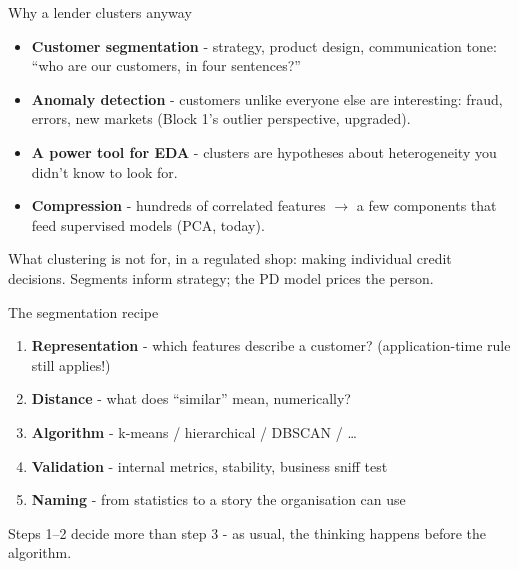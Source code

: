 \documentclass[10pt,aspectratio=169]{beamer}
\begin{document}
\begin{frame}{Why a lender clusters anyway}
  \begin{itemize}
    \item \textbf{Customer segmentation} - strategy, product design,
          communication tone: ``who are our customers, in four sentences?''
    \item \textbf{Anomaly detection} - customers unlike everyone else are
          interesting: fraud, errors, new markets (Block 1's outlier
          perspective, upgraded).
    \item \textbf{A power tool for EDA} - clusters are hypotheses about
          heterogeneity you didn't know to look for.
    \item \textbf{Compression} - hundreds of correlated features
          $\to$ a few components that feed supervised models (PCA, today).
  \end{itemize}
  \vspace{0.5em}
  \begin{center}\small
    What clustering is \alert{not} for, in a regulated shop: making
    individual credit decisions. Segments inform strategy; the PD model
    prices the person.
  \end{center}
\end{frame}

\begin{frame}{The segmentation recipe}
  \begin{enumerate}
    \item \textbf{Representation} - which features describe a customer?
          (application-time rule still applies!)
    \item \textbf{Distance} - what does ``similar'' mean, numerically?
    \item \textbf{Algorithm} - k-means / hierarchical / DBSCAN / \ldots
    \item \textbf{Validation} - internal metrics, stability,
          \alert{business sniff test}
    \item \textbf{Naming} - from statistics to a story the organisation
          can use
  \end{enumerate}
  \vspace{0.6em}
  \begin{center}
    Steps 1--2 decide more than step 3 - as usual, the thinking happens
    \alert{before} the algorithm.
  \end{center}
\end{frame}
\end{document}

